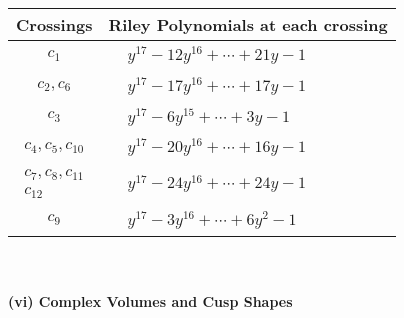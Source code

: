\documentclass[1p]{elsarticle_modified}
\theoremstyle{definition}
\begin{document}
\begin{tabular}{m{50pt}|m{274pt}}
Crossings & \hspace{64pt}Riley Polynomials at each crossing \\
\hline $$\begin{aligned}c_{1}\end{aligned}$$&$\begin{aligned}
&y^{17}-12 y^{16}+\cdots+21 y-1
\end{aligned}$\\
\hline $$\begin{aligned}c_{2},c_{6}\end{aligned}$$&$\begin{aligned}
&y^{17}-17 y^{16}+\cdots+17 y-1
\end{aligned}$\\
\hline $$\begin{aligned}c_{3}\end{aligned}$$&$\begin{aligned}
&y^{17}-6 y^{15}+\cdots+3 y-1
\end{aligned}$\\
\hline $$\begin{aligned}c_{4},c_{5},c_{10}\end{aligned}$$&$\begin{aligned}
&y^{17}-20 y^{16}+\cdots+16 y-1
\end{aligned}$\\
\hline $$\begin{aligned}c_{7},c_{8},c_{11}\\c_{12}\end{aligned}$$&$\begin{aligned}
&y^{17}-24 y^{16}+\cdots+24 y-1
\end{aligned}$\\
\hline $$\begin{aligned}c_{9}\end{aligned}$$&$\begin{aligned}
&y^{17}-3 y^{16}+\cdots+6 y^2-1
\end{aligned}$\\
\hline
\end{tabular}\\~\\
\newpage\flushleft \textbf{(vi) Complex Volumes and Cusp Shapes}
\end{document}
